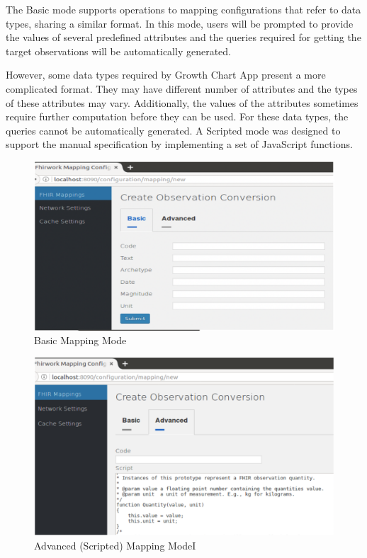 \documentclass[sigconf]{acmart}
\begin{document}
The Basic mode supports operations to mapping configurations that refer to data types, sharing a similar format. In this mode, users will be prompted to provide the values of several predefined attributes and the queries required for getting the target observations will be automatically generated.

However, some data types required by Growth Chart App present a more complicated format. They may have different number of attributes and the types of these attributes may vary. Additionally, the values of the attributes sometimes require further computation before they can be used. For these data types, the queries cannot be automatically generated. A Scripted mode was designed to support the manual specification by implementing a set of JavaScript functions. 


\begin{figure}[!!h] 
	\centering 
	\includegraphics[width=0.8\columnwidth]{basicmapping.png}
	\caption{Basic Mapping Mode	} 
	\label{fig:basicmap}
\end{figure}

\begin{figure}[!!h] 
	\centering 
	\includegraphics[width=0.8\columnwidth]{advancedmapping.png}
	\caption{Advanced (Scripted) Mapping ModeI} 
	\label{fig:advancedmap}
\end{figure}
\end{document}
